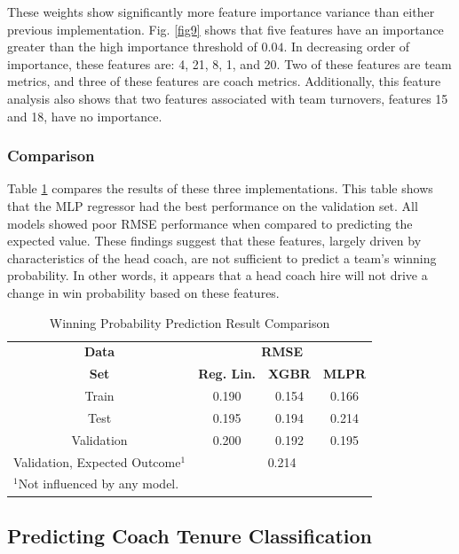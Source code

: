 \documentclass[conference]{IEEEtran}
\begin{document}
These weights show significantly more feature importance variance than either previous implementation. Fig. \ref{fig9} shows that five features have an importance greater than the high importance threshold of $0.04$. In decreasing order of importance, these features are: 4, 21, 8, 1, and 20. Two of these features are team metrics, and three of these features are coach metrics. Additionally, this feature analysis also shows that two features associated with team turnovers, features 15 and 18, have no importance.

\subsubsection{Comparison}
Table \ref{cum1} compares the results of these three implementations. This table shows that the MLP regressor had the best performance on the validation set. All models showed poor RMSE performance when compared to predicting the expected value. These findings suggest that these features, largely driven by characteristics of the head coach, are not sufficient to predict a team's winning probability. In other words, it appears that a head coach hire will not drive a change in win probability based on these features.

\begin{table}[htbp]
\caption{Winning Probability Prediction Result Comparison}
\begin{center}
\begin{tabular}{|c||c|c|c|}
\hline
\textbf{Data} & \multicolumn{3}{|c|}{\textbf{RMSE}}\\
\cline{2-4} 
\textbf{Set} & \textbf{Reg. Lin.} &  \textbf{XGBR} &  \textbf{MLPR} \\
\hline
\hline
Train & 0.190 & 0.154 & 0.166\\
\hline
Test & 0.195 & 0.194 & 0.214 \\
\hline
Validation & 0.200 & 0.192 & 0.195 \\
\hline
Validation, Expected Outcome$^{\mathrm{1}}$ & \multicolumn{3}{|c|}{0.214} \\
\hline
\multicolumn{2}{l}{$^{\mathrm{1}}$Not influenced by any model.}
\end{tabular}
\label{cum1}
\end{center}
\end{table}

\subsection{Predicting Coach Tenure Classification}
\end{document}
